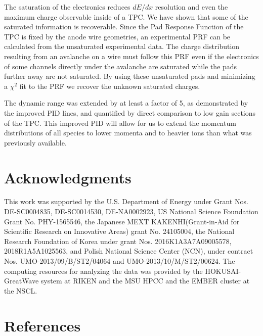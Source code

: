 \documentclass[review]{elsarticle}
\begin{document}
The saturation  of the electronics reduces $dE/dx$ resolution and even the maximum charge observable inside of a TPC.  We have shown that some of the saturated information is recoverable. Since the Pad Response Function of the TPC is fixed by the anode wire geometries, an experimental PRF can be calculated from the unsaturated experimental data. The charge distribution resulting from an avalanche on a wire must follow this PRF even if the electronics of some channels directly under the avalanche are saturated while the pads further away are not saturated. By using these unsaturated pads and minimizing a $\chi^2$ fit  to the PRF we recover the unknown saturated charges. 

The dynamic range was extended by at least a factor of 5, as demonstrated by the improved PID lines, and quantified by direct comparison to low gain sections of the TPC. This improved PID will allow for us to extend the momentum distributions of all species to lower momenta and to heavier ions than what was previously available. 


\section{Acknowledgments}
This work was supported by the U.S. Department of Energy under Grant Nos.  DE-SC0004835,  DE-SC0014530, DE-NA0002923,  US  National Science Foundation Grant  No.  PHY-1565546, the  Japanese  MEXT  KAKENHI(Grant-in-Aid  for  Scientific  Research  on  Innovative  Areas)  grant  No. 24105004, the National Research Foundation of Korea under grant Nos. 2016K1A3A7A09005578, 2018R1A5A1025563, and Polish National Science Center (NCN), under contract Nos. UMO-2013/09/B/ST2/04064 and UMO-2013/10/M/ST2/00624. The computing resources for analyzing the data was provided by the HOKUSAI-GreatWave system at RIKEN and the MSU HPCC and the EMBER cluster at the NSCL. 

\section*{References}


\end{document}
